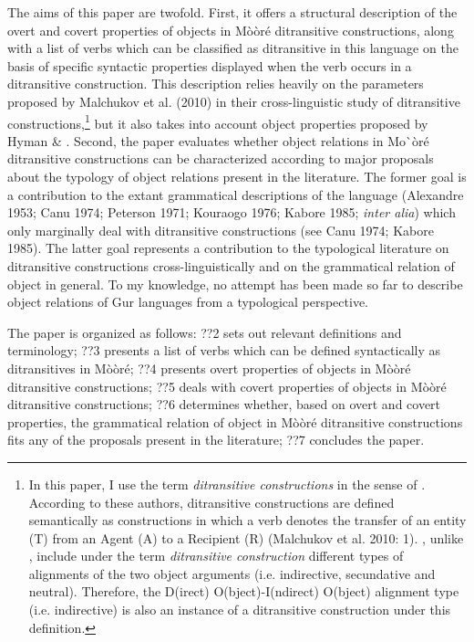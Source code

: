 \documentclass[output=paper]{langsci/langscibook}
\begin{document}
The aims of this paper are twofold. First, it offers a structural description of the overt and covert properties of objects in M\`{o}\`{o}r\'{e} ditransitive constructions, along with a list of verbs which can be classified as ditransitive in this language on the basis of specific syntactic properties displayed when the verb occurs in a ditransitive construction. This description relies heavily on the parameters proposed by Malchukov et al.\textit{ }(2010) in their cross-linguistic study of ditransitive constructions,\footnote{ In this paper, I use the term \textit{ditransitive constructions} in the sense of \citet{MalchukovEtAl2010}. According to these authors, ditransitive constructions are defined semantically as constructions in which a verb denotes the transfer of an entity (T) from an Agent (A) to a Recipient (R) (Malchukov et al. 2010: 1). \citet{MalchukovEtAl2010}, unlike \citet{Goldberg1995}, include under the term \textit{ditransitive construction} different types of alignments of the two object arguments (i.e. indirective, secundative and neutral). Therefore, the D(irect) O(bject)-I(ndirect) O(bject) alignment type (i.e. indirective) is also an instance of a ditransitive construction under this definition. } but it also takes into account object properties proposed by Hyman \& \citet{Duranti1982}.  Second, the paper evaluates whether object relations in Mo\`{ }\`{o}r\'{e} ditransitive constructions can be characterized according to major proposals about the typology of object relations present in the literature. The former goal is a contribution to the extant grammatical descriptions of the language (Alexandre 1953; Canu 1974; Peterson 1971; Kouraogo 1976; Kabore 1985; \textit{inter alia}) which only marginally deal with ditransitive constructions (see Canu 1974; Kabore 1985). The latter goal represents a contribution to the typological literature on ditransitive constructions cross-linguistically and on the grammatical relation of object in general. To my knowledge, no attempt has been made so far to describe object relations of Gur languages from a typological perspective.  

The paper is organized as follows: ??2 sets out relevant definitions and terminology; ??3 presents a list of verbs which can be defined syntactically as ditransitives in M\`{o}\`{o}r\'{e}; ??4 presents overt properties of objects in M\`{o}\`{o}r\'{e} ditransitive constructions; ??5 deals with covert properties of objects in M\`{o}\`{o}r\'{e} ditransitive constructions; ??6 determines whether, based on overt and covert properties, the grammatical relation of object in M\`{o}\`{o}r\'{e} ditransitive constructions fits any of the proposals present in the literature; ??7 concludes the paper.    
\end{document}
